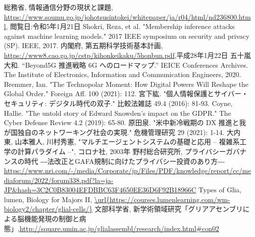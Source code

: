 \begin{thebibliography}{9}
総務省, 情報通信分野の現状と課題, \url{https://www.soumu.go.jp/johotsusintokei/whitepaper/ja/r04/html/nd236800.html}, 閲覧日:令和5年1月21日
Shokri, Reza, et al. "Membership inference attacks against machine learning models." 2017 IEEE symposium on security and privacy (SP). IEEE, 2017.
内閣府, 第五期科学技術基本計画, \url{https://www8.cao.go.jp/cstp/kihonkeikaku/5honbun.pdf},平成28年1月22日
五十嵐大和. ``Beyond5G 推進戦略 6G へのロードマップ.'' IEICE Conferences Archives. The Institute of Electronics, Information and Communication Engineers, 2020. 
Bremmer, Ian. "The Technopolar Moment: How Digital Powers Will Reshape the Global Order." Foreign Aff. 100 (2021): 112.
宮下紘. "個人情報保護とサイバー・セキュリティ: デジタル時代の双子." 比較法雑誌 49.4 (2016): 81-93.
Coyne, Hallie. "The untold story of Edward Snowden’s impact on the GDPR." The Cyber Defense Review 4.2 (2019): 65-80.
原田泉. "米中新冷戦期の DX 推進と我が国独自のネットワーキング社会の実現." 危機管理研究 29 (2021): 1-14.
大内 東, 山本雅人, 川村秀憲, "マルチエージェントシステムの基礎と応用 -- 複雑系工学の計算パラダイム --", コロナ社, 2003年
野村総合研究所, プライバシーガバナンスの時代 ―法改正とGAFA規制に向けたプライバシー投資のあり方― \url{https://www.nri.com/-/media/Corporate/jp/Files/PDF/knowledge/report/cc/mediaforum/2022/forum338.pdf?la=ja-JP&hash=3C2C0B83004EFDBBC63F4650EE36D6F92B18966C}
Types of Glia, lumen, Biology for Majors II,
\url{\url{https://courses.lumenlearning.com/wm-biology2/chapter/glial-cells/}}
文部科学省, 新学術領域研究「グリアアセンブリによる脳機能発現の制御と病態」,\url{http://square.umin.ac.jp/glialassembl/research/index.html#con02}
\end{thebibliography}
